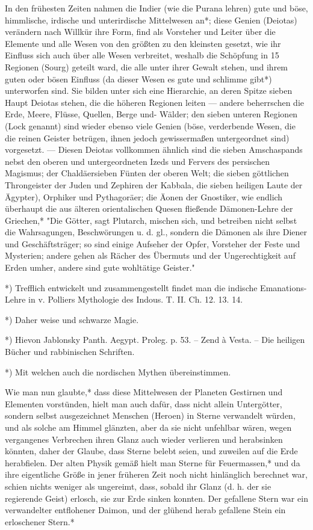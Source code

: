 \documentclass[a4paper, 11pt, oneside, polutonikogreek, german]{article}
\begin{document}
In den frühesten Zeiten nahmen die Indier (wie die Purana lehren) gute und böse, himmlische, irdische und unterirdische Mittelwesen an*; diese Genien (Deiotas) verändern nach Willkür ihre Form, find als Vorsteher und Leiter über die Elemente und alle Wesen von den größten zu den kleinsten gesetzt, wie ihr Einfluss sich auch über alle Wesen verbreitet, weshalb die Schöpfung in 15 Regionen (Sourg) geteilt ward, die alle unter ihrer Gewalt stehen, und ihrem guten oder bösen Einfluss (da dieser Wesen es gute und schlimme gibt*) unterworfen sind. Sie bilden unter sich eine Hierarchie, an deren Spitze sieben Haupt Deiotas stehen, die die höheren Regionen leiten --- andere beherrschen die Erde, Meere, Flüsse, Quellen, Berge und- Wälder; den sieben unteren Regionen (Lock genannt) sind wieder ebenso viele Genien (böse, verderbende Wesen, die die reinen Geister betrügen, ihnen jedoch gewissermaßen untergeordnet sind) vorgesetzt. --- Diesen Deiotas vollkommen ähnlich sind die sieben Amschaspands nebst den oberen und untergeordneten Izeds und Fervers des persischen Magismus; der Chaldäersieben Fünten der oberen Welt; die sieben göttlichen Throngeister der Juden und Zephiren der Kabbala, die sieben heiligen Laute der Ägypter), Orphiker und Pythagoräer; die Äonen der Gnostiker, wie endlich überhaupt die aus älteren orientalischen Quesen fließende Dämonen-Lehre der Griechen,* "Die Götter, sagt Plutarch, mischen sich, und betreiben nicht selbst die Wahrsagungen, Beschwörungen u. d. gl., sondern die Dämonen als ihre Diener und Geschäftsträger; so sind einige Aufseher der Opfer, Vorsteher der Feste und Mysterien; andere gehen als Rächer des Übermuts und der Ungerechtigkeit auf Erden umher, andere sind gute wohltätige Geister."

*) Trefflich entwickelt und zusammengestellt findet man die indische Emanations-Lehre in v. Polliers Mythologie des Indous. T. II. Ch. 12. 13. 14.

*) Daher weise und schwarze Magie.

*) Hievon Jablonsky Panth. Aegypt. Proleg. p. 53. -- Zend à Vesta. -- Die heiligen Bücher und rabbinischen Schriften.

*) Mit welchen auch die nordischen Mythen übereinstimmen.

Wie man nun glaubte,* dass diese Mittelwesen der Planeten Gestirnen und Elementen vorstünden, hielt man auch dafür, dass nicht allein Untergötter, sondern selbst ausgezeichnet Menschen (Heroen) in Sterne verwandelt würden, und als solche am Himmel glänzten, aber da sie nicht unfehlbar wären, wegen vergangenes Verbrechen ihren Glanz auch wieder verlieren und herabsinken könnten, daher der Glaube, dass Sterne belebt seien, und zuweilen auf die Erde herabfielen. Der alten Physik gemäß hielt man Sterne für Feuermassen,* und da ihre eigentliche Größe in jener früheren Zeit noch nicht hinlänglich berechnet war, schien nichts weniger als ungereimt, dass, sobald ihr Glanz (d. h. der sie regierende Geist) erlosch, sie zur Erde sinken konnten. Der gefallene Stern war ein verwandelter entflohener Daimon, und der glühend herab gefallene Stein ein erloschener Stern.*
\end{document}
